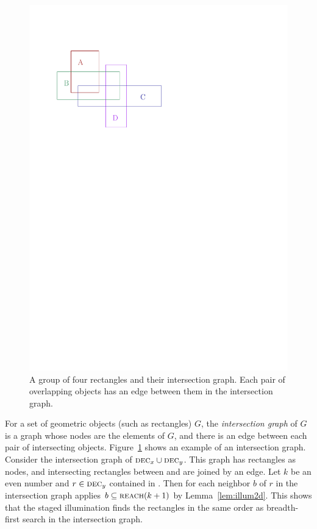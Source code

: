 \documentclass[english,gradu]{tktltiki2018}
\begin{document}
\begin{figure}
	\includegraphics[scale=0.7,page=2]{fig/inter}
	\caption{A group of four rectangles and their intersection graph. Each pair of overlapping objects has an edge between them in the intersection graph.}\label{fig:inter}
\end{figure}

For a set of geometric objects (such as rectangles) $G$, the \emph{intersection graph} of $G$ is a graph whose nodes are the elements of $G$, and there is an edge between each pair of intersecting objects.
Figure~\ref{fig:inter} shows an example of an intersection graph.
Consider the intersection graph of $\textsc{dec}_{x}\cup\textsc{dec}_{y}$.
This graph has rectangles as nodes, and intersecting rectangles between  and  are joined by an edge.
Let $k$ be an even number and $r\in\textsc{dec}_{y}$ contained in .
Then for each neighbor $b$ of $r$ in the intersection graph applies $b\subseteq\textsc{reach}(k+1)$ by Lemma~\ref{lem:illum2d}.
This shows that the staged illumination finds the rectangles in the same order as breadth-first search in the intersection graph.
\end{document}
